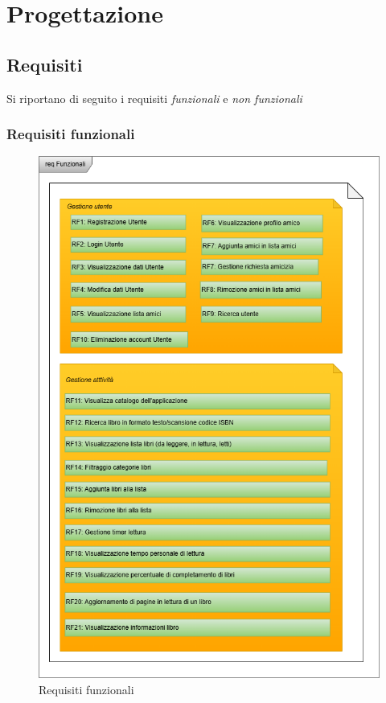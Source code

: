 \documentclass{article}
\begin{document}
\section{Progettazione}

\subsection{Requisiti}
Si riportano di seguito i requisiti \textit{funzionali} e \textit{non funzionali}
\subsubsection{Requisiti funzionali}

\begin{figure}[H]
  \centering
  \includegraphics[width=.9\linewidth]{req_funzionali.png}
  \caption{Requisiti funzionali}
  \label{fig:sitemap}
\end{figure}
\end{document}
